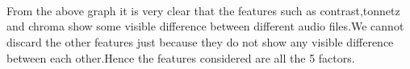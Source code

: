 \documentclass[11pt]{article}
\begin{document}
    \begin{center}
    \end{center}
    { \hspace*{\fill} \\}
    
    \begin{center}
    \end{center}
    { \hspace*{\fill} \\}
    
    \begin{center}
    \end{center}
    { \hspace*{\fill} \\}
    
    From the above graph it is very clear that the features such as
contrast,tonnetz and chroma show some visible difference between
different audio files.We cannot discard the other features just because
they do not show any visible difference between each other.Hence the
features considered are all the 5 factors.
\end{document}
